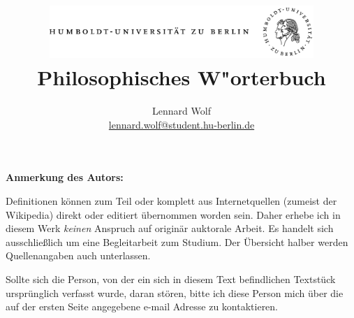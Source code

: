 \documentclass[twoside,twocolumn]{book}
\begin{document}
\title{
	\includegraphics*[width=0.75\textwidth]{images/hu_logo.png}\\
	\vspace{24pt}
	Philosophisches W"orterbuch}
\author{Lennard Wolf\\
        \href{mailto:lennard.wolf@student.hu-berlin.de}{lennard.wolf@student.hu-berlin.de}}
\maketitle

\textbf{Anmerkung des Autors:} 

Definitionen können zum Teil oder komplett aus Internetquellen (zumeist der Wikipedia) direkt oder editiert übernommen worden sein. Daher erhebe ich in diesem Werk \emph{keinen} Anspruch auf originär auktorale Arbeit. Es handelt sich ausschließlich um eine Begleitarbeit zum Studium. Der Übersicht halber werden Quellenangaben auch unterlassen. 

Sollte sich die Person, von der ein sich in diesem Text befindlichen Textstück ursprünglich verfasst wurde, daran stören, bitte ich diese Person mich über die auf der ersten Seite angegebene e-mail Adresse zu kontaktieren.
\end{document}
